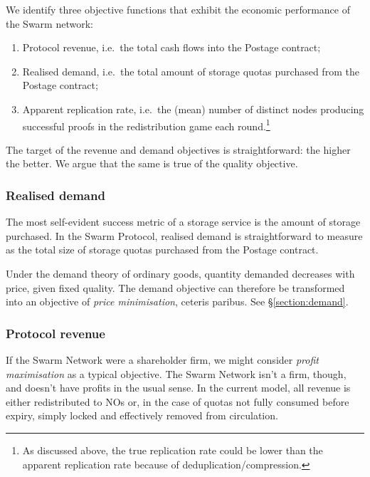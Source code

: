 We identify three objective functions that exhibit the economic performance of the Swarm network:
%
\begin{enumerate}

  \item Protocol revenue, i.e.~the total cash flows into the Postage contract;

  \item Realised demand, i.e.~the total amount of storage quotas purchased from the Postage contract;

  \item Apparent replication rate, i.e.~the (mean) number of distinct nodes producing successful proofs in the redistribution game each round.\footnote{As discussed above, the true replication rate could be lower than the apparent replication rate because of deduplication/compression.}

\end{enumerate}
%
The target of the revenue and demand objectives is straightforward: the higher the better.
%
We argue that the same is true of the quality objective.


\subsubsection{Realised demand}

The most self-evident success metric of a storage service is the amount of storage purchased.
%
In the Swarm Protocol, realised demand is straightforward to measure as the total size of storage quotas purchased from the Postage contract.

Under the demand theory of ordinary goods, quantity demanded decreases with price, given fixed quality.
%
The demand objective can therefore be transformed into an objective of \emph{price minimisation}, ceteris paribus.
%
See \S\ref{section:demand}.


\subsubsection{Protocol revenue}

If the Swarm Network were a shareholder firm, we might consider \emph{profit maximisation} as a typical objective.
%
The Swarm Network isn't a firm, though, and doesn't have profits in the usual sense.
%
In the current model, all revenue is either redistributed to NOs or, in the case of quotas not fully consumed before expiry, simply locked and effectively removed from circulation.

